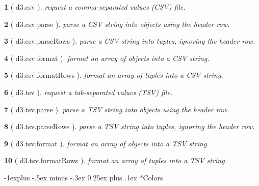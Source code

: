 \documentclass[10pt,landscape,letterpaper]{article}
\makeatletter
\newcounter{thm}
\newcommand{\hdrule}{\vspace{-4pt} \hdashrule[0.25ex]{\fill}{.5pt}{1pt}\vspace{-4pt}}
\theoremstyle{mytheoremstyle}
\newtheorem*{thm}{}
\renewcommand{\subsection}{\@startsection{subsection}{2}{0mm}%
                                {-1explus -.5ex minus -.3ex}%
                                {0.25ex plus .1ex}%
                                {\normalfont\normalsize\bfseries}}
\makeatother
\begin{document}
\begin{multicols}{3}
\begin{thm} [ d3.csv ]  request a comma-separated values (CSV) file.
\end{thm}\begin{thm} [ d3.csv.parse ]  parse a CSV string into objects using the header row.
\end{thm}\begin{thm} [ d3.csv.parseRows ]  parse a CSV string into tuples, ignoring the header row.
\end{thm}\begin{thm} [ d3.csv.format ]  format an array of objects into a CSV string.
\end{thm}\begin{thm} [ d3.csv.formatRows ]  format an array of tuples into a CSV string.
\end{thm}\begin{thm} [ d3.tsv ]  request a tab-separated values (TSV) file.
\end{thm}\begin{thm} [ d3.tsv.parse ]  parse a TSV string into objects using the header row.
\end{thm}\begin{thm} [ d3.tsv.parseRows ]  parse a TSV string into tuples, ignoring the header row.
\end{thm}\begin{thm} [ d3.tsv.format ]  format an array of objects into a TSV string.
\end{thm}\begin{thm} [ d3.tsv.formatRows ]  format an array of tuples into a TSV string.\end{thm}
\hdrule
\subsection*{Colors}


\end{multicols}
\end{document}
